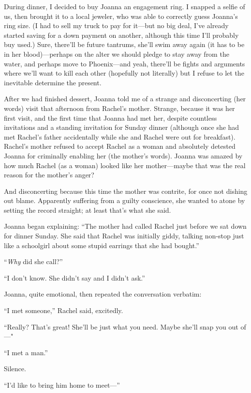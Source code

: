 During dinner, I decided to buy Joanna an engagement ring. I snapped a
selfie of us, then brought it to a local jeweler, who was able to
correctly guess Joanna's ring size. (I had to sell my truck to pay for
it---but no big deal, I've already started saving for a down payment on
another, although this time I'll probably buy used.) Sure, there'll be
future tantrums, she'll swim away again (it has to be in her
blood)---perhaps on the alter we should pledge to stay away from the
water, and perhaps move to Phoenix---and yeah, there'll be fights and
arguments where we'll want to kill each other (hopefully not literally)
but I refuse to let the inevitable determine the present.

After we had finished dessert, Joanna told me of a strange and
disconcerting (her words) visit that afternoon from Rachel's mother.
Strange, because it was her first visit, and the first time that Joanna
had met her, despite countless invitations and a standing invitation for
Sunday dinner (although once she had met Rachel's father accidentally
while she and Rachel were out for breakfast). Rachel's mother refused to
accept Rachel as a woman and absolutely detested Joanna for criminally
enabling her (the mother's words). Joanna was amazed by how much Rachel
(as a woman) looked like her mother---maybe that was the real reason for
the mother's anger?

And disconcerting because this time the mother was contrite, for once
not dishing out blame. Apparently suffering from a guilty conscience,
she wanted to atone by setting the record straight; at least that's what
she said.

Joanna began explaining: ``The mother had called Rachel just before we
sat down for dinner Sunday. She said that Rachel was initially giddy,
talking non-stop just like a schoolgirl about some stupid earrings that
she had bought.''

``\emph{Why} did she call?''

``I don't know. She didn't say and I didn't ask.''

Joanna, quite emotional, then repeated the conversation verbatim:

``I met someone,'' Rachel said, excitedly.

``Really? That's great! She'll be just what you need. Maybe she'll snap
you out of---"

``I met a man.''

Silence.

``I'd like to bring him home to meet---''

